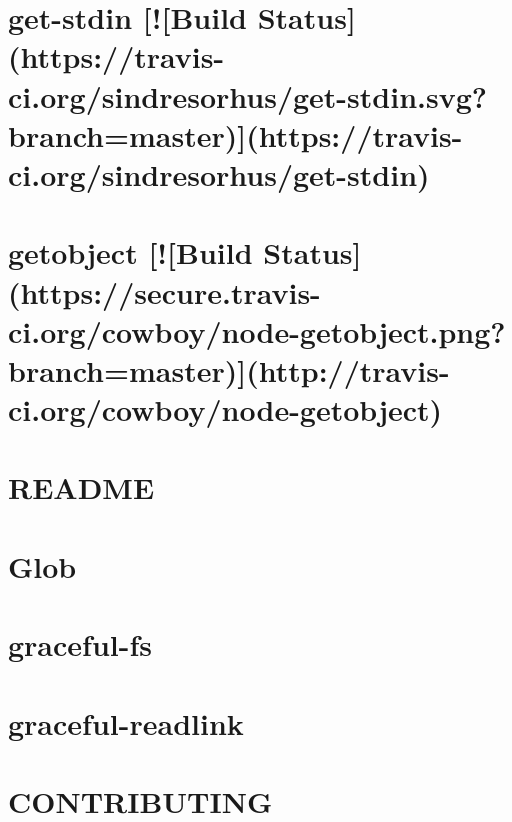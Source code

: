 \documentclass[twoside]{book}
\newcommand{\+}{\discretionary{\mbox{\scriptsize$\hookleftarrow$}}{}{}}
\begin{document}
\chapter{get-\/stdin \mbox{[}!\mbox{[}Build Status\mbox{]}(https\+://travis-\/ci.org/sindresorhus/get-\/stdin.svg?branch=master)\mbox{]}(https\+://travis-\/ci.org/sindresorhus/get-\/stdin)}
\label{md_app_web_node_modules_get-stdin_readme}

\chapter{getobject \mbox{[}!\mbox{[}Build Status\mbox{]}(https\+://secure.travis-\/ci.org/cowboy/node-\/getobject.png?branch=master)\mbox{]}(http\+://travis-\/ci.org/cowboy/node-\/getobject)}
\label{md_app_web_node_modules_getobject__r_e_a_d_m_e}

\chapter{R\+E\+A\+D\+ME}
\label{md_app_web_node_modules_glob_node_modules_inherits__r_e_a_d_m_e}

\chapter{Glob}
\label{md_app_web_node_modules_glob__r_e_a_d_m_e}

\chapter{graceful-\/fs}
\label{md_app_web_node_modules_graceful-fs__r_e_a_d_m_e}

\chapter{graceful-\/readlink}
\label{md_app_web_node_modules_graceful-readlink__r_e_a_d_m_e}

\chapter{C\+O\+N\+T\+R\+I\+B\+U\+T\+I\+NG}
\label{md_app_web_node_modules_grunt__c_o_n_t_r_i_b_u_t_i_n_g}

\end{document}
